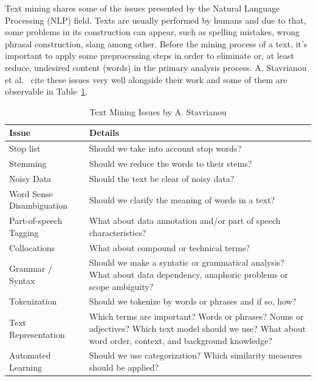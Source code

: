 Text mining shares some of the issues presented by the Natural Language Processing (NLP) field. Texts are usually performed by humans and due to that, some problems in its construction can appear, such as spelling mistakes, wrong phrasal construction, slang among other. Before the mining process of a text, it's important to apply some preprocessing steps in order to eliminate or, at least reduce, undesired content (words) in the primary analysis process.
A. Stavrianou et al.~\cite{kn:Stavrianou2007} cite these issues very well alongside their work and some of them are observable in Table~\ref{table:textminingissues}.

\begin{table}[htbp]
	\centering
	\caption{Text Mining Issues by A. Stavrianou \cite{kn:Stavrianou2007}}
	\label{table:textminingissues}
	\begin{tabular}{ | l | p{7cm} |}
		\hline \textbf{Issue}            & \textbf{Details}\\
		\hline Stop list                 & Should we take into account stop words?\\ 
		\hline Stemming                  & Should we reduce the words to their stems?\\ 
		\hline Noisy Data                & Should the text be clear of noisy data?\\ 
		\hline Word Sense Disambiguation & Should we clarify the meaning of words in a text?\\ 
		\hline Part-of-speech Tagging    & What about data annotation and/or part of speech characteristics?\\ 
		\hline Collocations              & What about compound or technical terms?\\ 
		\hline Grammar / Syntax          & Should we make a syntatic or grammatical analysis? What about data dependency, anaphoric problems or scope ambiguity?\\ 
		\hline Tokenization              & Should we tokenize by words or phrases and if so, how?\\ 
		\hline Text Representation       & Which terms are important? Words or phrases? Nouns or adjectives? Which text model should we use? What about word order, context, and background knowledge? \\ 
		\hline Automated Learning        & Should we use categorization? Which similarity measures should be applied? \\ \hline
	\end{tabular}
\end{table}

